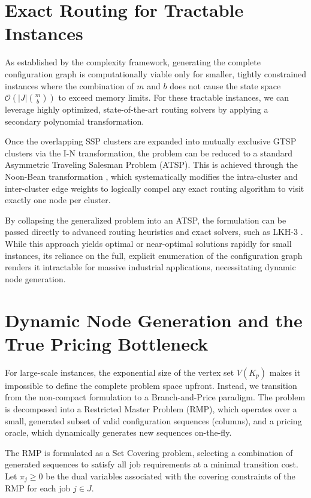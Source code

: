 \documentclass[12pt]{article}
\begin{document}
	
	\section{Exact Routing for Tractable Instances}
	
	As established by the complexity framework, generating the complete configuration graph is computationally viable only for smaller, tightly constrained instances where the combination of $m$ and $b$ does not cause the state space $\mathcal{O}(|J| \binom{m}{b})$ to exceed memory limits. For these tractable instances, we can leverage highly optimized, state-of-the-art routing solvers by applying a secondary polynomial transformation.
	
	Once the overlapping SSP clusters are expanded into mutually exclusive GTSP clusters via the I-N transformation, the problem can be reduced to a standard Asymmetric Traveling Salesman Problem (ATSP). This is achieved through the Noon-Bean transformation \citep{Noon1993}, which systematically modifies the intra-cluster and inter-cluster edge weights to logically compel any exact routing algorithm to visit exactly one node per cluster.
	
	By collapsing the generalized problem into an ATSP, the formulation can be passed directly to advanced routing heuristics and exact solvers, such as LKH-3 \citep{Helsgaun2015}. While this approach yields optimal or near-optimal solutions rapidly for small instances, its reliance on the full, explicit enumeration of the configuration graph renders it intractable for massive industrial applications, necessitating dynamic node generation.
	
	\section{Dynamic Node Generation and the True Pricing Bottleneck}
	
	For large-scale instances, the exponential size of the vertex set $V(K_p)$ makes it impossible to define the complete problem space upfront. Instead, we transition from the non-compact formulation to a Branch-and-Price paradigm. The problem is decomposed into a Restricted Master Problem (RMP), which operates over a small, generated subset of valid configuration sequences (columns), and a pricing oracle, which dynamically generates new sequences on-the-fly.
	
	The RMP is formulated as a Set Covering problem, selecting a combination of generated sequences to satisfy all job requirements at a minimal transition cost. Let $\pi_j \ge 0$ be the dual variables associated with the covering constraints of the RMP for each job $j \in J$. 
	
\end{document}
